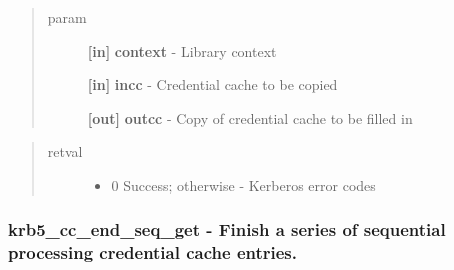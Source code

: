 \documentclass[letterpaper,10pt,english]{sphinxmanual}
\begin{document}
\begin{quote}\begin{description}
\item[{param}] \leavevmode
\textbf{{[}in{]}} \textbf{context} - Library context

\textbf{{[}in{]}} \textbf{incc} - Credential cache to be copied

\textbf{{[}out{]}} \textbf{outcc} - Copy of credential cache to be filled in

\end{description}\end{quote}
\begin{quote}\begin{description}
\item[{retval}] \leavevmode\begin{itemize}
\item {} 
0   Success; otherwise - Kerberos error codes

\end{itemize}

\end{description}\end{quote}


\subsubsection{krb5\_cc\_end\_seq\_get -  Finish a series of sequential processing credential cache entries.}
\label{appdev/refs/api/krb5_cc_end_seq_get:krb5-cc-end-seq-get-finish-a-series-of-sequential-processing-credential-cache-entries}\label{appdev/refs/api/krb5_cc_end_seq_get::doc}

\begin{fulllineitems}
\label{appdev/refs/api/krb5_cc_end_seq_get:krb5_cc_end_seq_get}
\end{fulllineitems}
\end{document}

